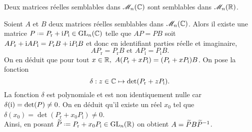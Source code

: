 \begin{prop}
    Deux matrices réelles semblables dans $\mathscr{M}_n(\mathbb{C})$ sont semblables dans $\mathscr{M}_n(\mathbb{R})$.
\end{prop}

\begin{preuve}
    Soient $A$ et $B$ deux matrices réelles semblables dans $\mathscr{M}_n(\mathbb{C})$. Alors il existe une matrice $P \defeq P_{\mathrm{r}} + \mi P_{\mathrm{i}} \in \Gl_n(\C)$ telle que $AP = PB$ soit $A P_{\mathrm{r}} + \mathrm{i} A P_{\mathrm{i}} = P_{\mathrm{r}} B + \mathrm{i} P_{\mathrm{i}} B$ et donc en identifiant parties réelle et imaginaire, $$A P_{\mathrm{r}} = P_{\mathrm{r}} B \text{ et } A P_{\mathrm{i}} = P_{\mathrm{i}} B.$$
    On en déduit que pour tout $x \in \R,\ A(P_{\mathrm{r}} + x P_{\mathrm{i}}) = (P_{\mathrm{r}} + x P_{\mathrm{i}})B$. On pose la fonction 
    $$\delta : z \in \mathbb{C} \mapsto \det(P_{\mathrm{r}} + z P_{\mathrm{i}}).$$ 
    La fonction $\delta$ est polynomiale et est non identiquement nulle car $\delta(\mathrm{i}) = \det(P) \not=0$. On en déduit qu'il existe un réel $x_0$ tel que $\delta(x_0) = \det(P_{\mathrm{r}} + x_0 P_{\mathrm{i}}) \not=0$. \\
    Ainsi, en posant $\widetilde{P} \defeq P_{\mathrm{r}} + x_0 P_{\mathrm{i}} \in \Gl_n(\R)$ on obtient $A = \widetilde{P}B\widetilde{P}^{-1}$.
\end{preuve}
